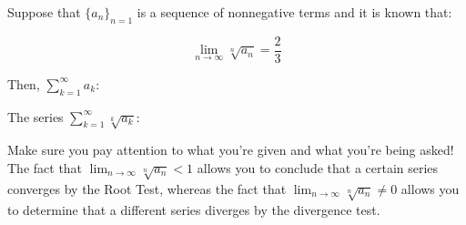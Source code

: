 \documentclass{ximera}
\author{Jim Talamo}
\begin{document}
\begin{exercise}
Suppose that $\{a_n\}_{n=1}$ is a sequence of nonnegative terms and it is known that:

\[
\lim_{n \to \infty} \sqrt[n]{a_n} = \frac{2}{3}
\]

Then, $\sum_{k=1}^{\infty} a_k$:
\begin{multipleChoice}
\end{multipleChoice}

The series $\sum_{k=1}^{\infty} \sqrt[k]{a_k}$:
\begin{multipleChoice}
\end{multipleChoice}

\begin{hint}
Make sure you pay attention to what you're given and what you're being asked!  The fact that $\lim_{n \to \infty} \sqrt[n]{a_n} <1$ allows you to conclude that a certain series converges by the Root Test, whereas the fact that $\lim_{n \to \infty} \sqrt[n]{a_n} \neq 0 $ allows you to determine that a different series diverges by the divergence test.
\end{hint}
\end{exercise}
\end{document}
